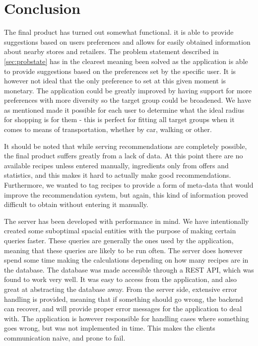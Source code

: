 \chapter{Conclusion}
\label{chap:conc}

The final product has turned out somewhat functional. it is able to provide suggestions based on users preferences and allows for easily obtained information about nearby stores and retailers. The problem statement described in \ref{sec:probstate} has in the clearest meaning been solved as the application is able to provide suggestions based on the preferences set by the specific user. It is however not ideal that the only preference to set at this given moment is monetary. The application could be greatly improved by having support for more preferences with more diversity so the target group could be broadened. We have as mentioned made it possible for each user to determine what the ideal radius for shopping is for them - this is perfect for fitting all target groups when it comes to means of transportation, whether by car, walking or other.

It should be noted that while serving recommendations are completely possible, the final product suffers greatly from a lack of data. At this point there are no available recipes unless entered manually, ingredients only from offers and statistics, and this makes it hard to actually make good recommendations.
Furthermore, we wanted to tag recipes to provide a form of meta-data that would improve the recommendation system, but again, this kind of information proved difficult to obtain without entering it manually.

The server has been developed with performance in mind. We have intentionally created some suboptimal spacial entities with the purpose of making certain queries faster. These queries are generally the ones used by the application, meaning that these queries are likely to be run often. The server does however spend some time making the calculations depending on how many recipes are in the database. The database was made accessible through a REST API, which was found to work very well. It was easy to access from the application, and also great at abstracting the database away. From the server side, extensive error handling is provided, meaning that if something should go wrong, the backend can recover, and will provide proper error messages for the application to deal with. The application is however responsible for handling cases where something goes wrong, but was not implemented in time. This makes the clients communication naive, and prone to fail.

